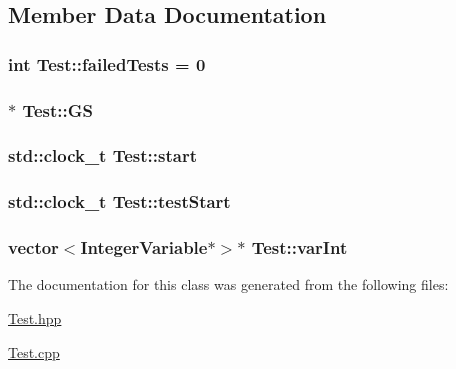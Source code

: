 \subsection{Member Data Documentation}
\hypertarget{class_test_a72dca50d6f671c662b15fd52c4846bca}{
\subsubsection[{failed\-Tests}]{\setlength{\rightskip}{0pt plus 5cm}int Test\-::failed\-Tests = 0\hspace{0.3cm}{\ttfamily [protected]}}}\label{class_test_a72dca50d6f671c662b15fd52c4846bca}
\hypertarget{class_test_a8dde0db9f022bb331283df8cc0b85d8c}{
\subsubsection[{G\-S}]{$\ast$ Test\-::\-G\-S\hspace{0.3cm}{\ttfamily [protected]}}}\label{class_test_a8dde0db9f022bb331283df8cc0b85d8c}
\hypertarget{class_test_abbea9e118d54f37e96661bcd314a9f6a}{
\subsubsection[{start}]{\setlength{\rightskip}{0pt plus 5cm}std\-::clock\-\_\-t Test\-::start\hspace{0.3cm}{\ttfamily [protected]}}}\label{class_test_abbea9e118d54f37e96661bcd314a9f6a}
\hypertarget{class_test_a0a7a04e46cd3875b6d81fc68fb92204f}{
\subsubsection[{test\-Start}]{\setlength{\rightskip}{0pt plus 5cm}std\-::clock\-\_\-t Test\-::test\-Start\hspace{0.3cm}{\ttfamily [protected]}}}\label{class_test_a0a7a04e46cd3875b6d81fc68fb92204f}
\hypertarget{class_test_aaaa874634bb96962296189b4910641f5}{
\subsubsection[{var\-Int}]{\setlength{\rightskip}{0pt plus 5cm}vector$<${\bf Integer\-Variable}$\ast$$>$$\ast$ Test\-::var\-Int\hspace{0.3cm}{\ttfamily [protected]}}}\label{class_test_aaaa874634bb96962296189b4910641f5}


The documentation for this class was generated from the following files\-:\begin{DoxyCompactItemize}
\item 
\hyperlink{_test_8hpp}{Test.\-hpp}\item 
\hyperlink{_test_8cpp}{Test.\-cpp}\end{DoxyCompactItemize}
